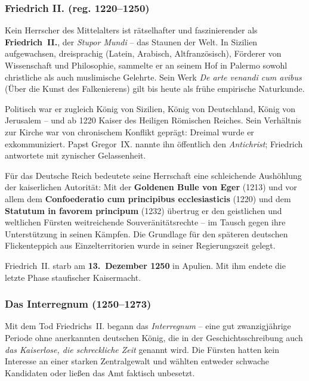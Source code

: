 \subsubsection{Friedrich II. (reg. 1220--1250)}\label{kaiser_friedrich_ii}

Kein Herrscher des Mittelalters ist rätselhafter und faszinierender als \textbf{Friedrich~II.}, der \textit{Stupor Mundi} -- das Staunen der Welt. In Sizilien aufgewachsen, dreisprachig (Latein, Arabisch, Altfranzösisch), Förderer von Wissenschaft und Philosophie, sammelte er an seinem Hof in Palermo sowohl christliche als auch muslimische Gelehrte. Sein Werk \textit{De arte venandi cum avibus} (Über die Kunst des Falkenierens) gilt bis heute als frühe empirische Naturkunde.

Politisch war er zugleich König von Sizilien, König von Deutschland, König von Jerusalem -- und ab 1220 Kaiser des Heiligen Römischen Reiches. Sein Verhältnis zur Kirche war von chronischem Konflikt geprägt: Dreimal wurde er exkommuniziert. Papst Gregor~IX. nannte ihn öffentlich den \textit{Antichrist}; Friedrich antwortete mit zynischer Gelassenheit.

Für das Deutsche Reich bedeutete seine Herrschaft eine schleichende Aushöhlung der kaiserlichen Autorität: Mit der \textbf{Goldenen Bulle von Eger} (1213) und vor allem dem \textbf{Confoederatio cum principibus ecclesiasticis} (1220) und dem \textbf{Statutum in favorem principum} (1232) übertrug er den geistlichen und weltlichen Fürsten weitreichende Souveränitätsrechte -- im Tausch gegen ihre Unterstützung in seinen Kämpfen. Die Grundlage für den späteren deutschen Flickenteppich aus Einzelterritorien wurde in seiner Regierungszeit gelegt.

Friedrich~II. starb am \textbf{13.~Dezember 1250} in Apulien. Mit ihm endete die letzte Phase staufischer Kaisermacht. \cite{niederstaetter_oesterreich}

\subsubsection{Das Interregnum (1250--1273)}\label{das_interregnum}

Mit dem Tod Friedrichs~II. begann das \textit{Interregnum} -- eine gut zwanzigjährige Periode ohne anerkannten deutschen König, die in der Geschichtsschreibung auch \textit{das Kaiserlose, die schreckliche Zeit} genannt wird. Die Fürsten hatten kein Interesse an einer starken Zentralgewalt und wählten entweder schwache Kandidaten oder ließen das Amt faktisch unbesetzt.

